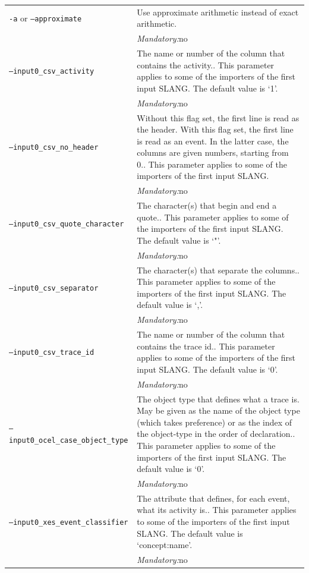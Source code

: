 {\begin{tabularx}{\linewidth}{lX}
\texttt{-a} or \texttt{--approximate} & Use approximate arithmetic instead of exact arithmetic.\\
&\textit{Mandatory:}\quad no\\
\texttt{--input0\_csv\_activity} & The name or number of the column that contains the activity.. This parameter applies to some of the importers of the first input SLANG. The default value is `1'.\\
&\textit{Mandatory:}\quad no\\
\texttt{--input0\_csv\_no\_header} & Without this flag set, the first line is read as the header. 
    With this flag set, the first line is read as an event. In the latter case, the columns are given numbers, starting from 0.. This parameter applies to some of the importers of the first input SLANG. \\
&\textit{Mandatory:}\quad no\\
\texttt{--input0\_csv\_quote\_character} & The character(s) that begin and end a quote.. This parameter applies to some of the importers of the first input SLANG. The default value is `"'.\\
&\textit{Mandatory:}\quad no\\
\texttt{--input0\_csv\_separator} & The character(s) that separate the columns.. This parameter applies to some of the importers of the first input SLANG. The default value is `,'.\\
&\textit{Mandatory:}\quad no\\
\texttt{--input0\_csv\_trace\_id} & The name or number of the column that contains the trace id.. This parameter applies to some of the importers of the first input SLANG. The default value is `0'.\\
&\textit{Mandatory:}\quad no\\
\texttt{--input0\_ocel\_case\_object\_type} & The object type that defines what a trace is. May be given as the name of the object type (which takes preference) or as the index of the object-type in the order of declaration.. This parameter applies to some of the importers of the first input SLANG. The default value is `0'.\\
&\textit{Mandatory:}\quad no\\
\texttt{--input0\_xes\_event\_classifier} & The attribute that defines, for each event, what its activity is.. This parameter applies to some of the importers of the first input SLANG. The default value is `concept:name'.\\
&\textit{Mandatory:}\quad no\\

\end{tabularx}}
